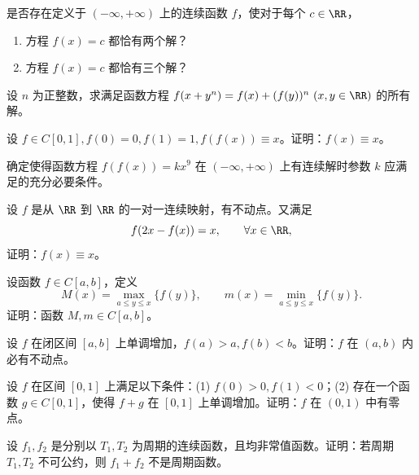 \begin{xreferenceproblem}[5]
是否存在定义于 $(-\infty,+\infty)$ 上的连续函数 $f$，使对于每个 $c\in\RR$，
  \begin{enumerate}[label=(\arabic*)]
    \item 方程 $f(x)=c$ 都恰有两个解？
    \item 方程 $f(x)=c$ 都恰有三个解？
  \end{enumerate}
\end{xreferenceproblem}

\begin{xreferenceproblem}[6]
设 $n$ 为正整数，求满足函数方程 $f(x+y^n)=f(x)+(f(y))^n\ (x,y\in\RR)$ 的所有解。
\end{xreferenceproblem}

\begin{xreferenceproblem}[7]
设 $f\in C[0,1],f(0)=0,f(1)=1,f(f(x))\equiv x$。证明：$f(x)\equiv x$。
\end{xreferenceproblem}

\begin{xreferenceproblem}[8]
确定使得函数方程 $f(f(x))=kx^9$ 在 $(-\infty,+\infty)$ 上有连续解时参数 $k$ 应满足的充分必要条件。
\end{xreferenceproblem}

\begin{xreferenceproblem}[9]
设 $f$ 是从 $\RR$ 到 $\RR$ 的一对一连续映射，有不动点。又满足
  \[
    f(2x-f(x))=x,\qquad \forall x\in\RR,
  \]
  证明：$f(x)\equiv x$。
\end{xreferenceproblem}

\begin{xreferenceproblem}[10]
设函数 $f\in C[a,b]$，定义
  \[
    M(x)=\max_{a\le y\le x}\{f(y)\},\qquad m(x)=\min_{a\le y\le x}\{f(y)\}.
  \]
  证明：函数 $M,m\in C[a,b]$。
\end{xreferenceproblem}

\begin{xreferenceproblem}[11]
设 $f$ 在闭区间 $[a,b]$ 上单调增加，$f(a)>a,f(b)<b$。证明：$f$ 在 $(a,b)$ 内必有不动点。
\end{xreferenceproblem}

\begin{xreferenceproblem}[12]
设 $f$ 在区间 $[0,1]$ 上满足以下条件：(1) $f(0)>0,f(1)<0$；(2) 存在一个函数 $g\in C[0,1]$，使得 $f+g$ 在 $[0,1]$ 上单调增加。证明：$f$ 在 $(0,1)$ 中有零点。
\end{xreferenceproblem}

\begin{xreferenceproblem}[13]
设 $f_1,f_2$ 是分别以 $T_1,T_2$ 为周期的连续函数，且均非常值函数。证明：若周期 $T_1,T_2$ 不可公约，则 $f_1+f_2$ 不是周期函数。
\end{xreferenceproblem}

